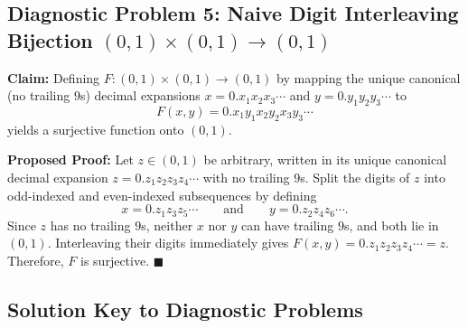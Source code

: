 \documentclass[11pt, letterpaper]{article}
\theoremstyle{definition}
\theoremstyle{remark}
\begin{document}
\subsection{Diagnostic Problem 5: Naive Digit Interleaving Bijection $(0, 1) \times (0, 1) \to (0, 1)$}

\textbf{Claim:} Defining $F : (0, 1) \times (0, 1) \to (0, 1)$ by mapping the unique canonical (no trailing $9$s) decimal expansions $x = 0.x_1 x_2 x_3 \cdots$ and $y = 0.y_1 y_2 y_3 \cdots$ to
\[
F(x, y) = 0.x_1 y_1 x_2 y_2 x_3 y_3 \cdots
\]
yields a surjective function onto $(0, 1)$.

\textbf{Proposed Proof:} Let $z \in (0, 1)$ be arbitrary, written in its unique canonical decimal expansion $z = 0.z_1 z_2 z_3 z_4 \cdots$ with no trailing $9$s. Split the digits of $z$ into odd-indexed and even-indexed subsequences by defining
\[
x = 0.z_1 z_3 z_5 \cdots \qquad \text{and} \qquad y = 0.z_2 z_4 z_6 \cdots.
\]
Since $z$ has no trailing $9$s, neither $x$ nor $y$ can have trailing $9$s, and both lie in $(0, 1)$. Interleaving their digits immediately gives $F(x, y) = 0.z_1 z_2 z_3 z_4 \cdots = z$. Therefore, $F$ is surjective. $\blacksquare$

\subsection{Solution Key to Diagnostic Problems}
\label{sec:solution_key}
\end{document}
